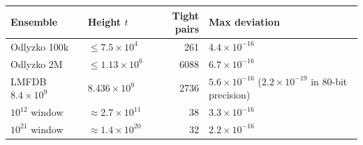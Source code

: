 \begin{tabular}{@{}llrl@{}}
\toprule
Ensemble & Height $t$ & Tight pairs & Max deviation\\
\midrule
Odlyzko 100k & $\le7.5\times10^{4}$ & 261 & $4.4\times10^{-16}$\\
Odlyzko 2M & $\le1.13\times10^{6}$ & 6088 & $6.7\times10^{-16}$\\
LMFDB $8.4\times10^{9}$ & $8.436\times10^{9}$ & 2736 & $5.6\times10^{-16}$ ($2.2\times10^{-19}$ in 80-bit precision)\\
$10^{12}$ window & $\approx2.7\times10^{11}$ & 38 & $3.3\times10^{-16}$\\
$10^{21}$ window & $\approx1.4\times10^{20}$ & 32 & $2.2\times10^{-16}$\\
\bottomrule
\end{tabular}
